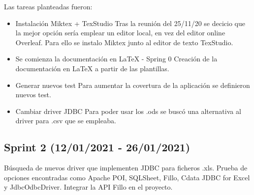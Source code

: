 Las tareas planteadas fueron:
\begin{itemize}
	\tightlist
	\item Instalación Miktex + TexStudio
		Tras la reunión del 25/11/20 se decicio que la mejor opción sería emplear un editor local, en vez del editor online Overleaf. Para ello se instalo Miktex junto al editor de texto TexStudio.
	\item Se comienza la documentación en LaTeX  - Spring 0
		Creación de la documentación en LaTeX a partir de las plantillas.
	\item Generar nuevos test
		Para aumentar la covertura de la aplicación se definieron nuevos test.
	\item Cambiar driver JDBC 
		Para poder usar los .ods se buscó una alternativa al driver para .csv que se empleaba.
\end{itemize}

\subsection{Sprint 2 (12/01/2021 - 26/01/2021)}
Búsqueda de nuevos driver que implementen JDBC para ficheros .xls. Prueba de opciones encontradas como Apache POI, SQLSheet, Fillo, Cdata JDBC for Excel y JdbcOdbcDriver. Integrar la API Fillo en el proyecto. 

